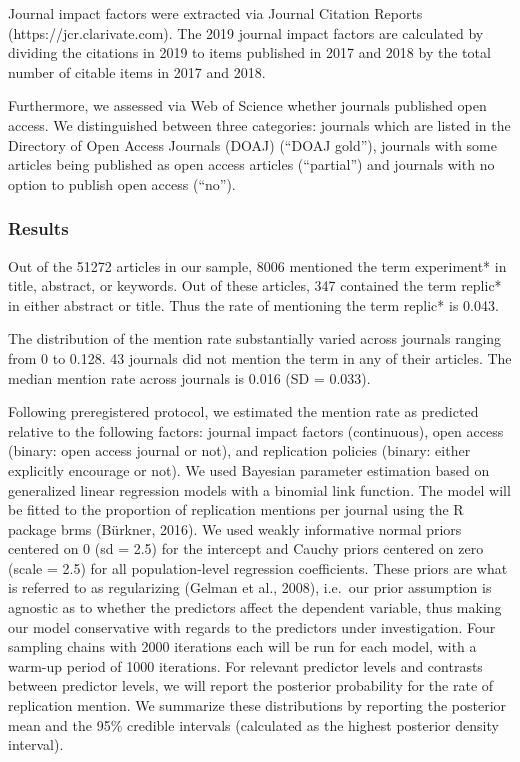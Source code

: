 \documentclass[]{elsarticle} %
\begin{document}
Journal impact factors were extracted via Journal Citation Reports
(https://jcr.clarivate.com). The 2019 journal impact factors are
calculated by dividing the citations in 2019 to items published in 2017
and 2018 by the total number of citable items in 2017 and 2018.

Furthermore, we assessed via Web of Science whether journals published
open access. We distinguished between three categories: journals which
are listed in the Directory of Open Access Journals (DOAJ) (``DOAJ
gold''), journals with some articles being published as open access
articles (``partial'') and journals with no option to publish open
access (``no'').

\hypertarget{results}{%
\subsubsection{Results}\label{results}}

Out of the 51272 articles in our sample, 8006 mentioned the term
experiment* in title, abstract, or keywords. Out of these articles, 347
contained the term replic* in either abstract or title. Thus the rate of
mentioning the term replic* is 0.043.

The distribution of the mention rate substantially varied across
journals ranging from 0 to 0.128. 43 journals did not mention the term
in any of their articles. The median mention rate across journals is
0.016 (SD = 0.033).

Following preregistered protocol, we estimated the mention rate as
predicted relative to the following factors: journal impact factors
(continuous), open access (binary: open access journal or not), and
replication policies (binary: either explicitly encourage or not). We
used Bayesian parameter estimation based on generalized linear
regression models with a binomial link function. The model will be
fitted to the proportion of replication mentions per journal using the R
package brms (Bürkner, 2016). We used weakly informative normal priors
centered on 0 (sd = 2.5) for the intercept and Cauchy priors centered on
zero (scale = 2.5) for all population-level regression coefficients.
These priors are what is referred to as regularizing (Gelman et al.,
2008), i.e.~our prior assumption is agnostic as to whether the
predictors affect the dependent variable, thus making our model
conservative with regards to the predictors under investigation. Four
sampling chains with 2000 iterations each will be run for each model,
with a warm-up period of 1000 iterations. For relevant predictor levels
and contrasts between predictor levels, we will report the posterior
probability for the rate of replication mention. We summarize these
distributions by reporting the posterior mean and the 95\% credible
intervals (calculated as the highest posterior density interval).
\end{document}
